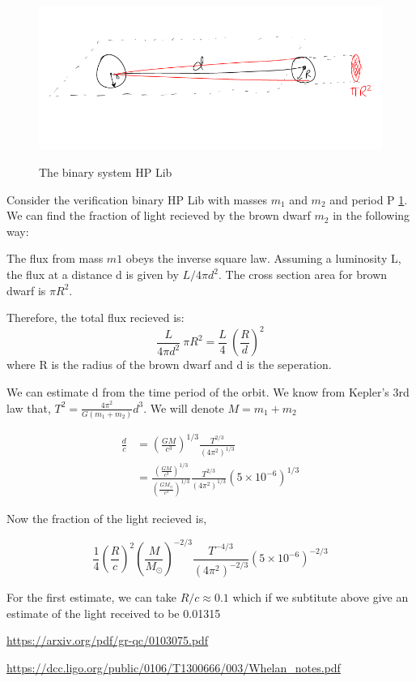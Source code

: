 \documentclass[10pt,a4paper]{article}
\begin{document}
\begin{figure}[ht]
\centering
\includegraphics[scale=0.5]{diagram1.png}
\label{1}
\caption{The binary system HP Lib}
\end{figure}

Consider the verification binary HP Lib with masses $m_1$ and $m_2$ and period P \ref{1}. We can find the fraction of light recieved by the brown dwarf $m_2$ in the following way:

The flux from mass $m1$ obeys the inverse square law. Assuming a luminosity L, the flux at a distance d is given by $L/4 \pi d^2$. The cross section area for brown dwarf is $\pi R^2$.


Therefore, the total flux recieved is: $$\frac{L}{4 \pi d^2} \ \pi R^2 = \frac{L}{4} \ \left(\frac{R}{d}\right)^2 $$ where R is the radius of the brown dwarf and d is the seperation.

We can estimate d from the time period of the orbit. We know from Kepler's 3rd law that, $T^2 = \frac{4 \pi^{2}}{G (m_1 + m_2)} d^3$. We will denote $M=m_1 + m_2$

\begin{align*}
\frac{d}{c}&=\left(\frac{GM}{c^3}\right)^{1/3} \frac{T^{2/3}}{(4 \pi^{2})^{1/3}}\\
&=\frac{\left(\frac{GM}{c^3}\right)^{1/3}}{\left(\frac{GM_{\odot}}{c^3}\right)^{1/3}} \frac{T^{2/3}}{(4\pi^2)^{1/3}} (5 \times 10^{-6})^{1/3}
\end{align*}

Now the fraction of the light recieved is,

\begin{equation}
\frac{1}{4} \left(\frac{R}{c}\right)^2 \left(\frac{M}{M_{\odot}}\right)^{-2/3} \frac{T^{-4/3}}{(4 \pi^2)^{-2/3}} (5 \times 10^{-6})^{-2/3}
\end{equation}

For the first estimate, we can take $R/c \approx 0.1$ which if we subtitute above give an estimate of the light received to be 0.01315 

\begin{thebibliography}{9}

				\url{https://arxiv.org/pdf/gr-qc/0103075.pdf}

 \url{https://dcc.ligo.org/public/0106/T1300666/003/Whelan_notes.pdf}
\end{thebibliography}
\end{document}
